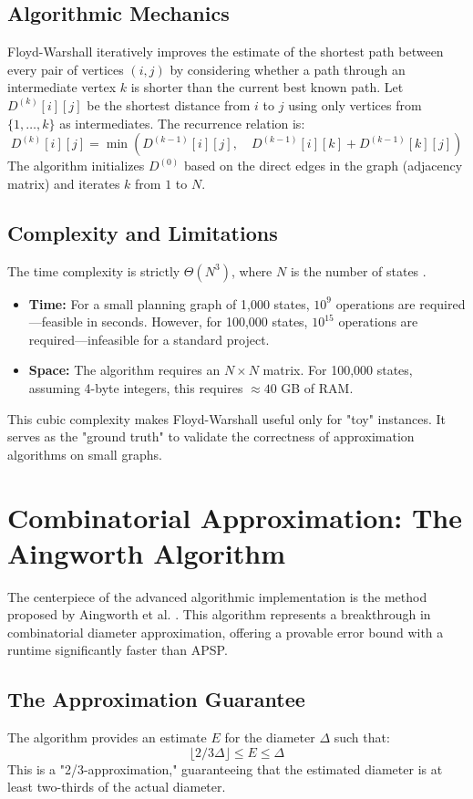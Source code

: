 \documentclass[12pt,a4paper]{report}
\begin{document}
\subsection{Algorithmic Mechanics}
Floyd-Warshall iteratively improves the estimate of the shortest path between every pair of vertices $(i, j)$ by considering whether a path through an intermediate vertex $k$ is shorter than the current best known path. Let $D^{(k)}[i][j]$ be the shortest distance from $i$ to $j$ using only vertices from $\{1, \dots, k\}$ as intermediates. The recurrence relation is:
\[
D^{(k)}[i][j] = \min(D^{(k-1)}[i][j], \quad D^{(k-1)}[i][k] + D^{(k-1)}[k][j])
\]
The algorithm initializes $D^{(0)}$ based on the direct edges in the graph (adjacency matrix) and iterates $k$ from $1$ to $N$.

\subsection{Complexity and Limitations}
The time complexity is strictly $\Theta(N^3)$, where $N$ is the number of states \cite{ecealgo}.
\begin{itemize}
    \item \textbf{Time:} For a small planning graph of 1,000 states, $10^9$ operations are required—feasible in seconds. However, for 100,000 states, $10^{15}$ operations are required—infeasible for a standard project.
    \item \textbf{Space:} The algorithm requires an $N \times N$ matrix. For 100,000 states, assuming 4-byte integers, this requires $\approx 40$ GB of RAM.
\end{itemize}
This cubic complexity makes Floyd-Warshall useful only for "toy" instances. It serves as the "ground truth" to validate the correctness of approximation algorithms on small graphs.

\section{Combinatorial Approximation: The Aingworth Algorithm}
The centerpiece of the advanced algorithmic implementation is the method proposed by Aingworth et al. \cite{aingworth96}. This algorithm represents a breakthrough in combinatorial diameter approximation, offering a provable error bound with a runtime significantly faster than APSP.

\subsection{The Approximation Guarantee}
The algorithm provides an estimate $E$ for the diameter $\Delta$ such that:
\[
\lfloor 2/3 \Delta \rfloor \le E \le \Delta
\]
This is a "2/3-approximation," guaranteeing that the estimated diameter is at least two-thirds of the actual diameter.
\end{document}
